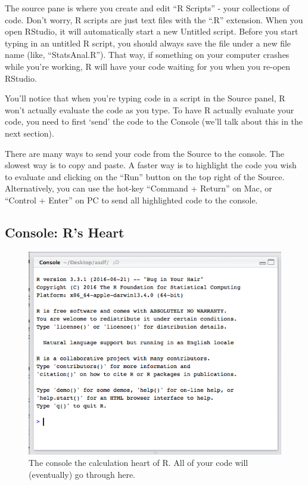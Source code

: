 \documentclass[
]{book}
\begin{document}
The source pane is where you create and edit ``R Scripts'' - your collections of code. Don't worry, R scripts are just text files with the ``.R'' extension. When you open RStudio, it will automatically start a new Untitled script. Before you start typing in an untitled R script, you should always save the file under a new file name (like, ``StatsAnal.R''). That way, if something on your computer crashes while you're working, R will have your code waiting for you when you re-open RStudio.

You'll notice that when you're typing code in a script in the Source panel, R won't actually evaluate the code as you type. To have R actually evaluate your code, you need to first `send' the code to the Console (we'll talk about this in the next section).

There are many ways to send your code from the Source to the console. The slowest way is to copy and paste. A faster way is to highlight the code you wish to evaluate and clicking on the ``Run'' button on the top right of the Source. Alternatively, you can use the hot-key ``Command + Return'' on Mac, or ``Control + Enter'' on PC to send all highlighted code to the console.

\hypertarget{console-rs-heart}{%
\subsection{Console: R's Heart}\label{console-rs-heart}}

\begin{figure}
\includegraphics[width=0.75\linewidth]{images/chapter-1/consoless} \caption{The console the calculation heart of R. All of your code will (eventually) go through here.}\label{fig:consolewindow}
\end{figure}
\end{document}

